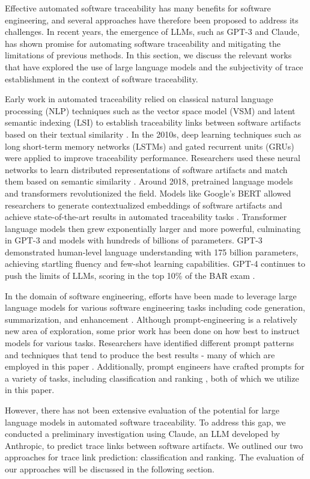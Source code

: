 Effective automated software traceability has many benefits for software engineering, and several approaches have therefore been proposed to address its challenges. In recent years, the emergence of LLMs, such as GPT-3 and Claude, has shown promise for automating software traceability and mitigating the limitations of previous methods. In this section, we discuss the relevant works that have explored the use of large language models and the subjectivity of trace establishment in the context of software traceability.

Early work in automated traceability relied on classical natural language processing (NLP) techniques such as the vector space model (VSM) and latent semantic indexing (LSI) to establish traceability links between software artifacts based on their textual similarity \cite{traceability_vsm, traceability_lsi}. In the 2010s, deep learning techniques such as long short-term memory networks (LSTMs) and gated recurrent units (GRUs) were applied to improve traceability performance. Researchers used these neural networks to learn distributed representations of software artifacts and match them based on semantic similarity \cite{traceability_nn}. Around 2018, pretrained language models and transformers revolutionized the field. Models like Google's BERT allowed researchers to generate contextualized embeddings of software artifacts and achieve state-of-the-art results in automated traceability tasks \cite{bert_pl, bert_nl}. Transformer language models then grew exponentially larger and more powerful, culminating in GPT-3 and models with hundreds of billions of parameters. GPT-3 demonstrated human-level language understanding with 175 billion parameters, achieving startling fluency and few-shot learning capabilities\cite{gpt2, gpt3, palm}. GPT-4 continues to push the limits of LLMs, scoring in the top 10\% of the BAR exam \cite{gpt4}.

In the domain of software engineering, efforts have been made to leverage large language models for various software engineering tasks including code generation, summarization, and enhancement \cite{DBLP:journals/corr/abs-2107-03374, Sridhara_G_Mazumdar_2023}. Although prompt-engineering is a relatively new area of exploration, some prior work has been done on how best to instruct models for various tasks. Researchers have identified different prompt patterns and techniques that tend to produce the best results - many of which are employed in this paper \cite{white_prompt_2023, ekin_prompt_2023}. Additionally, prompt engineers have crafted prompts for a variety of tasks, including classification \cite{mayer_prompt_2023, han_ptr_2021} and ranking \cite{qin_large_2023}, both of which we utilize in this paper.


However, there has not been extensive evaluation of the potential for large language models in automated software traceability. To address this gap, we conducted a preliminary investigation using Claude, an LLM developed by Anthropic, to predict trace links between software artifacts. We outlined our two approaches for trace link prediction: classification and ranking. The evaluation of our approaches will be discussed in the following section.